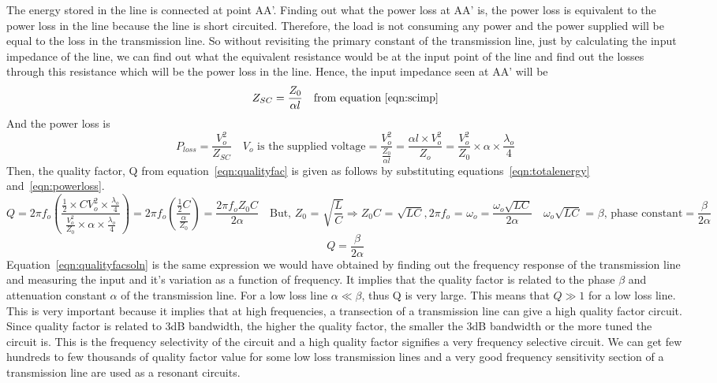 The energy stored in the line is connected at point AA'. Finding out what the power loss at AA' is, the power loss is equivalent to the power loss in the line because the line is short circuited. Therefore, the load is not consuming any power and the power supplied will be equal to the loss in the transmission line. So without revisiting the primary constant of the transmission line, just by calculating the input impedance of the line, we can find out what the equivalent resistance would be at the input point of the line and find out the losses through this resistance which will be the power loss in the line. Hence, the input impedance seen at AA' will be
\begin{equation*}
Z_{SC} = \frac{Z_0}{\alpha l}\quad\text{from equation~\eqref{eqn:scimp}}
\end{equation*}
And the power loss is
\begin{dmath}
P_{loss} = \frac{V_{o}^{2}}{Z_{SC}}\quad V_{o}\text{ is the supplied voltage}
= \frac{V_{o}^{2}}{\frac{Z_0}{\alpha l}}
= \frac{\alpha l\times V_o^2}{Z_o}
= \frac{V_{o}^{2}}{Z_0}\times\alpha \times\frac{\lambda_{o}}{4}
\label{eqn:powerloss}
\end{dmath}
Then, the quality factor, Q from equation~\eqref{eqn:qualityfac} is given as follows by substituting equations~\eqref{eqn:totalenergy} and~\eqref{eqn:powerloss}.
\begin{dmath*}
Q = 2 \pi f_{o}\left(\frac{\frac{1}{2}\times CV_{o}^{2}\times\frac{\lambda_{o}}{4}}{\frac{V_{o}^{2}}{Z_0}\times\alpha \times\frac{\lambda_{o}}{4}}\right)
= 2 \pi f_{o}\left(\frac{\frac{1}{2}C}{\frac{\alpha}{Z_0}}\right)
= \frac{2 \pi f_{o} Z_0C}{2\alpha}\quad\text{But, }Z_0\text{ = }\sqrt{\frac{L}{C}}\Rightarrow Z_0C\text{ = }\sqrt{LC}, 2\pi f_{o}\text{ = }\omega_{o}
= \frac{\omega_{o}\sqrt{LC}}{2 \alpha}\quad\omega_{o}\sqrt{LC}\text{ = }\beta\text{, phase constant}
= \frac{\beta}{2 \alpha}
\end{dmath*}
\begin{equation}
Q = \frac{\beta}{2 \alpha}
\label{eqn:qualityfacsoln}
\end{equation}
Equation~\eqref{eqn:qualityfacsoln} is the same expression we would have obtained by finding out the frequency response of the transmission line and measuring the input and it's variation as a function of frequency. It implies that the quality factor is related to the phase $\beta$ and attenuation constant $ \alpha$ of the transmission line. For a low loss line $ \alpha \ll \beta$, thus Q is very large. This means that $Q \gg 1$ for a low loss line. This is very important because it implies that at high frequencies, a transection of a transmission line can give a high quality factor circuit. Since quality factor is related to 3dB bandwidth, the higher the quality factor, the smaller the 3dB bandwidth or the more tuned the circuit is. This is the frequency selectivity of the circuit and a high quality factor signifies a very frequency selective circuit. We can get few hundreds to few thousands of quality factor value for some low loss transmission lines and a very good frequency sensitivity section of a transmission line are used as a resonant circuits.

